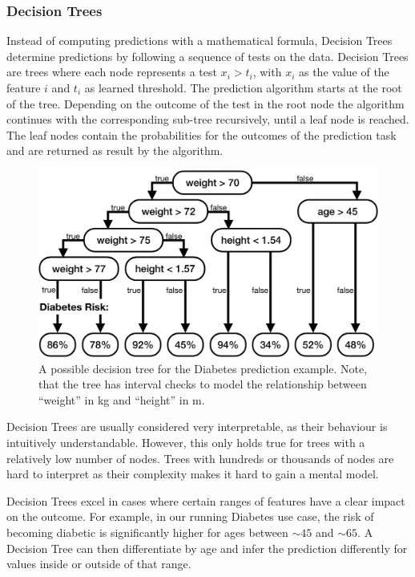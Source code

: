 \subsubsection{Decision Trees}
Instead of computing predictions with a mathematical formula, Decision Trees \cite{mlbook} determine predictions by following a sequence of tests on the data.
Decision Trees are trees where each node represents a test $x_i > t_i$, with $x_i$ as the value of the feature $i$ and $t_i$ as learned threshold.
The prediction algorithm starts at the root of the tree.
Depending on the outcome of the test in the root node the algorithm continues with the corresponding sub-tree recursively, until a leaf node is reached.
The leaf nodes contain the probabilities for the outcomes of the prediction task and are returned as result by the algorithm.

\begin{figure}
    \centering
    \includegraphics[width=0.9\linewidth]{tex/decisiontree}
    \caption[Example Decision Tree.]{A possible decision tree for the Diabetes prediction example\footnotemark. Note, that the tree has interval checks to model the relationship between ``weight'' in \si{kg} and ``height'' in \si{m}.}
    \label{figs:dctree}
\end{figure}

Decision Trees are usually considered very interpretable, as their behaviour is intuitively understandable.
However, this only holds true for trees with a relatively low number of nodes.
Trees with hundreds or thousands of nodes are hard to interpret as their complexity makes it hard to gain a mental model.

Decision Trees excel in cases where certain ranges of features have a clear impact on the outcome.
For example, in our running Diabetes use case, the risk of becoming diabetic is significantly higher for ages between ${\sim}45$ and ${\sim}65$.
A Decision Tree can then differentiate by age and infer the prediction differently for values inside or outside of that range.

